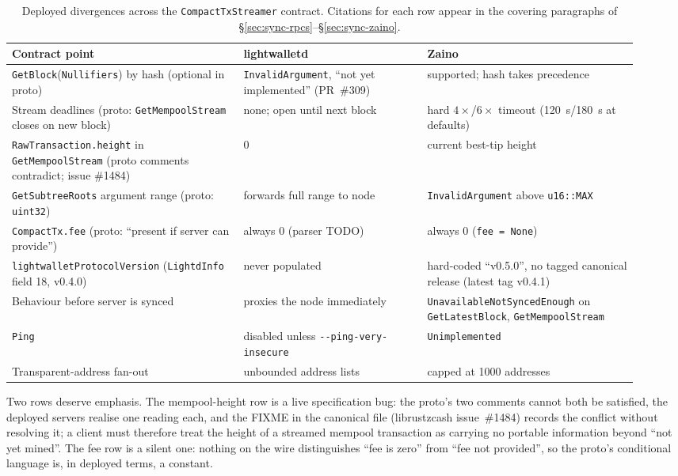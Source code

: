 \documentclass[11pt,a4paper]{article}
\theoremstyle{definition}
\begin{document}
\begin{table}[htbp]
\centering
\small
\begin{tabular}{@{}p{0.34\linewidth}p{0.27\linewidth}p{0.31\linewidth}@{}}
\toprule
Contract point & lightwalletd & Zaino \\
\midrule
\texttt{GetBlock}(\texttt{Nullifiers}) by hash (optional in proto) &
\texttt{InvalidArgument}, ``not yet implemented'' (PR~\#309) &
supported; hash takes precedence \\
\addlinespace
Stream deadlines (proto: \texttt{GetMempoolStream} closes on new block) &
none; open until next block &
hard $4\times$/$6\times$ timeout (120~s/180~s at defaults) \\
\addlinespace
\texttt{RawTransaction.height} in \texttt{GetMempoolStream} (proto
comments contradict; issue \#1484) &
$0$ &
current best-tip height \\
\addlinespace
\texttt{GetSubtreeRoots} argument range (proto: \texttt{uint32}) &
forwards full range to node &
\texttt{InvalidArgument} above \texttt{u16::MAX} \\
\addlinespace
\texttt{CompactTx.fee} (proto: ``present if server can provide'') &
always 0 (parser TODO) &
always 0 (\texttt{fee = None}) \\
\addlinespace
\texttt{lightwalletProtocolVersion} (\texttt{LightdInfo} field 18,
v0.4.0) &
never populated &
hard-coded ``v0.5.0'', no tagged canonical release (latest tag
v0.4.1) \\
\addlinespace
Behaviour before server is synced &
proxies the node immediately &
\texttt{UnavailableNotSyncedEnough} on \texttt{GetLatestBlock},
\texttt{GetMempoolStream} \\
\addlinespace
\texttt{Ping} &
disabled unless \texttt{-{}-ping-very-insecure} &
\texttt{Unimplemented} \\
\addlinespace
Transparent-address fan-out &
unbounded address lists &
capped at 1000 addresses \\
\bottomrule
\end{tabular}
\caption{Deployed divergences across the \texttt{CompactTxStreamer}
contract. Citations for each row appear in the covering paragraphs of
\S\ref{sec:sync-rpcs}--\S\ref{sec:sync-zaino}.}
\label{tab:sync-divergences}
\end{table}

Two rows deserve emphasis. The mempool-height row is a live
specification bug: the proto's two comments cannot both be satisfied,
the deployed servers realise one reading each, and the FIXME in the
canonical file (librustzcash issue~\#1484) records the conflict without
resolving it; a client must therefore treat the height of a streamed
mempool transaction as carrying no portable information beyond ``not yet
mined''. The fee row is a silent one: nothing on the wire distinguishes
``fee is zero'' from ``fee not provided'', so the proto's conditional
language is, in deployed terms, a constant.
\end{document}
